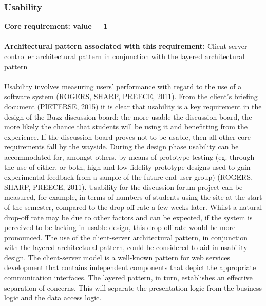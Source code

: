 \documentclass[a4paper]{article}
\begin{document}
\subsubsection{Usability}
\textbf{Core requirement: value = 1}
\\
\\\textbf{Architectural pattern associated with this requirement:} Client-server controller architectural pattern in conjunction with the layered architectural pattern
\\
\\Usability involves measuring users’ performance with regard to the use of a software system (ROGERS, SHARP, PREECE, 2011). From the client’s briefing document (PIETERSE, 2015) it is clear that usability is a key requirement in the design of the Buzz discussion board: the more usable the discussion board, the more likely the chance that students will be using it and benefitting from the experience. If the discussion board proves not to be usable, then all other core requirements fall by the wayside. During the design phase usability can be accommodated for, amongst others, by means of prototype testing (eg. through the use of either, or both, high and low fidelity prototype designs used to gain experimental feedback from a sample of the future end-user group) (ROGERS, SHARP, PREECE, 2011). Usability for the discussion forum project can be measured, for example, in terms of numbers of students using the site at the start of the semester, compared to the drop-off rate a few weeks later. Whilst a natural drop-off rate may be due to other factors and can be expected, if the system is perceived to be lacking in usable design, this drop-off rate would be more pronounced. The use of the client-server architectural pattern, in conjunction with the layered architectural pattern, could be considered to aid in usability design. The client-server model is a well-known pattern for web services development that contains independent components that depict the appropriate communication interfaces. The layered pattern, in turn, establishes an effective separation of concerns. This will separate the presentation logic from the business logic and the data access logic.
\end{document}
